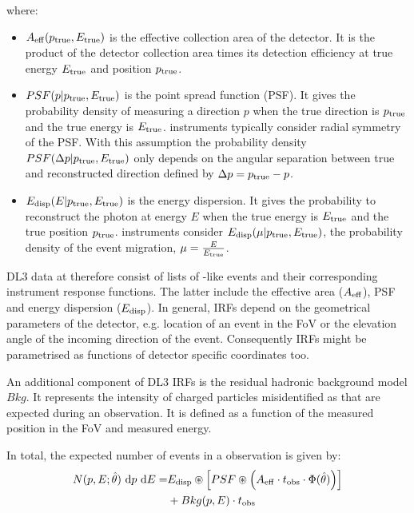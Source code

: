 \documentclass[longauth]{aa}
\begin{document}
where:
\begin{itemize}
\setlength\itemsep{1em}
\item $A_{\rm eff}(p_{\rm true}, E_{\rm true})$ is the effective collection area of the detector. It is the product
  of the detector collection area times its detection efficiency at true energy $E_{\rm true}$ and position $p_{\rm true}$.
\item $PSF(p|p_{\rm true}, E_{\rm true})$ is the point spread function (PSF). It gives the probability density of
  measuring a direction $p$ when the true direction is $p_{\rm true}$ and the true energy is $E_{\rm true}$.
  \gammaray instruments typically consider radial symmetry of the PSF. With this assumption the probability density 
  $PSF(\Delta p|p_{\rm true}, E_{\rm true})$ only depends on the angular separation between true
 and reconstructed direction defined by $\Delta p = p_{\rm true} - p$.  
\item $E_{\rm disp}(E|p_{\rm true}, E_{\rm true})$ is the energy dispersion. It gives the probability to
  reconstruct the photon at energy $E$ when the true energy is $E_{\rm true}$ and the true position $p_{\rm true}$.
  \gammaray instruments consider $E_{\rm disp}(\mu|p_{\rm true}, E_{\rm true})$, the probability density of the event
  migration, $\mu=\frac{E}{E_{\rm true}}$.
\end{itemize}

DL3 \gammaray data at therefore consist of lists of \gammaray-like events and their
corresponding instrument response functions. The latter include the effective area ($A_{\rm eff}$),
PSF and energy dispersion ($E_{\rm disp}$).
In general, IRFs depend on the geometrical parameters of the detector, e.g. location 
of an event in the FoV or the elevation angle of the incoming direction of the event.
Consequently IRFs might be parametrised as functions of detector specific coordinates too.


An additional component of DL3 IRFs is the residual hadronic background model $Bkg$.
It represents the intensity of charged particles misidentified as \gammarays that are expected
during an observation. It is defined as a function of the measured position in the FoV
and measured energy.

In total, the expected number of events in a \gammaray observation is given by:
\begin{equation}
	\begin{split}
  N(p, E; \hat{\theta})\ {\rm d}p\ {\rm d}E =  &E_{\rm disp} \circledast \left[ PSF \circledast \left( A_{\rm eff} \cdot t_{\rm obs} \cdot \Phi(\hat{\theta}) \right) \right]\\
                       & + Bkg(p, E) \cdot t_{\rm obs}
	\end{split}
\end{equation}
				
\end{document}
